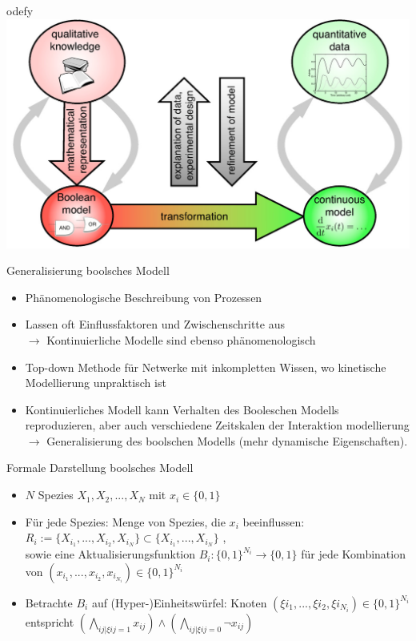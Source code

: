 \documentclass[handout]{beamer}
\begin{document}
\begin{frame}{odefy}
\includegraphics[scale=0.8]{odefy.jpg}
\end{frame}

\begin{frame}{Generalisierung boolsches Modell}
\begin{itemize}
	\item Ph\"anomenologische Beschreibung von Prozessen
	\pause
	\item Lassen oft Einflussfaktoren und Zwischenschritte aus
	\pause
	\\ $\rightarrow$ Kontinuierliche Modelle sind ebenso ph\"anomenologisch
	\pause
	\item Top-down Methode f\"ur Netwerke mit inkompletten Wissen, wo kinetische Modellierung unpraktisch ist
	\pause
	\item Kontinuierliches Modell kann Verhalten des Booleschen Modells reproduzieren, aber auch verschiedene Zeitskalen der Interaktion modellierung
	\pause
	\\ $\rightarrow$ Generalisierung des boolschen Modells (mehr dynamische Eigenschaften).
\end{itemize}
\end{frame}

\begin{frame}{Formale Darstellung boolsches Modell}
\begin{itemize}
	\item $N$ Spezies $X_{1}, X_{2},..., X_{N}$ mit $x_{i} \in \{0,1\}$
	\pause
	\item F\"ur jede Spezies: Menge von Spezies, die $x_{i}$ beeinflussen: $R_{i} := \{X_{i_{1}}, ..., X_{i_{2}}, X_{i_{N}}\} \subset \{X_{i_{1}},...,X_{i_{N}}\}$
	\pause
	, \\ sowie eine Aktualisierungsfunktion $B_{i}: \{0,1\}^{N_{i}} \to \{0,1\}$ f\"ur jede Kombination von $(x_{i_{1}}, ..., x_{i_{2}}, x_{i_{N_{i}}}) \in \{0,1\}^{N_{i}}$
	\pause
	\item Betrachte $B_{i}$ auf (Hyper-)Einheitsw\"urfel: Knoten $(\xi{i_{1}}, ..., \xi{i_{2}}, \xi{i_{N_{i}}}) \in \{0,1\}^{N_{i}}$ entspricht $(\bigwedge_{ij | \xi{ij} = 1} x_{ij}) \wedge (\bigwedge_{ij | \xi{ij} = 0} \neg x_{ij}) $
\end{itemize}
\end{frame}
\end{document}
